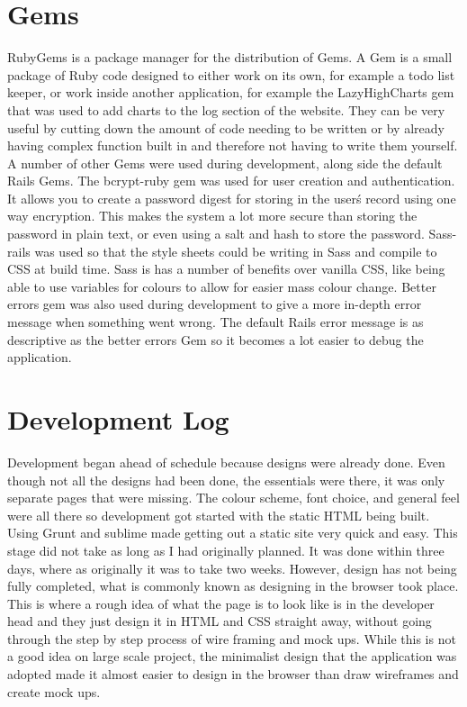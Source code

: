 \section{Gems}
RubyGems \citep{rubygems:2009} is a package manager for the distribution of Gems. A Gem is a small package of Ruby code designed to either work on its own, for example a todo list keeper, or work inside another application, for example the LazyHighCharts gem that was used to add charts to the log section of the website. They can be very useful by cutting down the amount of code needing to be written or by already having complex function built in and therefore not having to write them yourself. A number of other Gems were used during development, along side the default Rails Gems. The bcrypt-ruby gem was used for user creation and authentication. It allows you to create a password digest for storing in the user\'s record using one way encryption. This makes the system a lot more secure than storing the password in plain text, or even using a salt and hash to store the password. Sass-rails was used so that the style sheets could be writing in Sass and compile to CSS at build time. Sass is has a number of benefits over vanilla CSS, like being able to use variables for colours to allow for easier mass colour change. Better errors gem was also used during development to give a more in-depth error message when something went wrong. The default Rails error message is as descriptive as the better errors Gem so it becomes a lot easier to debug the application.

\section{Development Log}
Development began ahead of schedule because designs were already done. Even though not all the designs had been done, the essentials were there, it was only separate pages that were missing. The colour scheme, font choice, and general feel were all there so development got started with the static HTML being built. Using Grunt \citep{grunt:2013} and sublime made getting out a static site very quick and easy. This stage did not take as long as I had originally planned. It was done within three days, where as originally it was to take two weeks. However, design has not being fully completed, what is commonly known as designing in the browser took place. This is where a rough idea of what the page is to look like is in the developer head and they just design it in HTML and CSS straight away, without going through the step by step process of wire framing and mock ups. While this is not a good idea on large scale project, the minimalist design that the application was adopted made it almost easier to design in the browser than draw wireframes and create mock ups.\\

